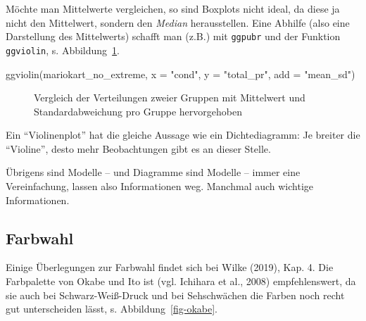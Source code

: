 \documentclass[
  letterpaper,
  twoside,
  open=any]{scrbook}
\newenvironment{Shaded}{\begin{snugshade}}{\end{snugshade}}
\newcommand{\AttributeTok}[1]{\textcolor[rgb]{0.40,0.45,0.13}{#1}}
\newcommand{\FunctionTok}[1]{\textcolor[rgb]{0.28,0.35,0.67}{#1}}
\newcommand{\NormalTok}[1]{\textcolor[rgb]{0.00,0.23,0.31}{#1}}
\newcommand{\StringTok}[1]{\textcolor[rgb]{0.13,0.47,0.30}{#1}}
\theoremstyle{definition}
\theoremstyle{definition}
\theoremstyle{definition}
\theoremstyle{remark}
\begin{document}
Möchte man Mittelwerte vergleichen, so sind Boxplots nicht ideal, da
diese ja nicht den Mittelwert, sondern den \emph{Median} herausstellen.
Eine Abhilfe (also eine Darstellung des Mittelwerts) schafft man (z.B.)
mit \texttt{ggpubr} und der Funktion \texttt{ggviolin}, s.
Abbildung~\ref{fig-comp-means-ggpubr}.

\begin{Shaded}
\begin{Highlighting}[]
\FunctionTok{ggviolin}\NormalTok{(mariokart\_no\_extreme, }
         \AttributeTok{x =} \StringTok{"cond"}\NormalTok{, }\AttributeTok{y =} \StringTok{"total\_pr"}\NormalTok{, }\AttributeTok{add =} \StringTok{"mean\_sd"}\NormalTok{) }
\end{Highlighting}
\end{Shaded}

\begin{figure}[H]


\caption{\label{fig-comp-means-ggpubr}Vergleich der Verteilungen zweier
Gruppen mit Mittelwert und Standardabweichung pro Gruppe hervorgehoben}

\end{figure}%

Ein \enquote{Violinenplot} hat die gleiche Aussage wie ein
Dichtediagramm: Je breiter die \enquote{Violine}, desto mehr
Beobachtungen gibt es an dieser Stelle.

Übrigens sind Modelle -- und Diagramme sind Modelle -- immer eine
Vereinfachung, lassen also Informationen weg. Manchmal auch wichtige
Informationen.

\subsection{Farbwahl}\label{sec-farbwahl}

Einige Überlegungen zur Farbwahl findet sich bei Wilke (2019), Kap. 4.
Die Farbpalette von Okabe und Ito ist (vgl. Ichihara et al., 2008)
empfehlenswert, da sie auch bei Schwarz-Weiß-Druck und bei Sehschwächen
die Farben noch recht gut unterscheiden lässt, s.
Abbildung~\ref{fig-okabe}.
\end{document}
